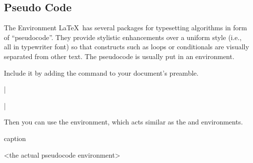 \subsection{Pseudo Code}

\begin{frame}[fragile]{The  Environment}
\LaTeX\ has several packages for typesetting algorithms in form of ``pseudocode''. They provide stylistic enhancements over a uniform style (i.e., all in typewriter font) so that constructs such as loops or conditionals are visually separated from other text. The pseudocode is usually put in an  environment. 

Include it by adding the command to your document's preamble. 
\begin{command}
\LC|\usepackage{algorithm}|
\end{command}

Then you can use the  environment, which acts similar as the  and  environments.

\begin{command}
\begin{LCL}
\begin{algorithm}[position]
  \caption{caption}
  \label{algorithm:label}
  <the actual pseudocode environment>
\end{algorithm}
\end{LCL}
\end{command}

\end{frame}

